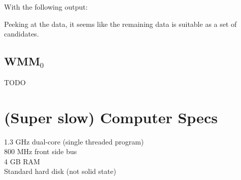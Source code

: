 \documentclass[a4paper, 12pt]{report}
\begin{document}
        With the following output:
        
        Peeking at the data, it seems like the remaining data is suitable as a set of candidates.
        
    \subsection{WMM$_0$}
        TODO

\section{(Super slow) Computer Specs}
    1.3 GHz dual-core (single threaded program) \\
    800 MHz front side bus \\
    4 GB RAM \\
    Standard hard disk (not solid state)
\end{document}
